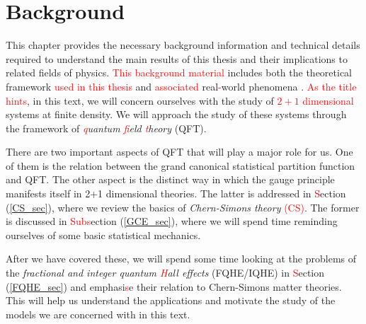 
    \graphicspath{{Background_Folder/figures/PNG/}{Background_Folder/figures/PDF/}{Background_Folder/figures/}}

\chapter{Background}
This chapter provides the necessary background information and technical details required to understand the main results of this thesis and their implications to related fields of physics. \textcolor{red}{This background material} includes both the theoretical framework \textcolor{red}{used in this thesis} and \textcolor{red}{associated} real\textcolor{red}{-}world phenomena  \colorbox{red}{ }. \textcolor{red}{As the title hints}, in this text, we will concern ourselves with the study of \textcolor{red}{$2+1$ dimensional} systems at finite density. We will approach the study of these \colorbox{red}{ }  systems through the framework of \textit{\textcolor{red}{q}uantum \textcolor{red}{f}ield \textcolor{red}{t}heory} (QFT). 

    There are two important aspects of QFT that will play a major role for us. One of them is the relation between the grand canonical statistical partition function and QFT. The other aspect is the distinct way in which the gauge principle manifests itself in 2+1 dimensional theories. The latter is addressed in \textcolor{red}{S}ection (\ref{CS_sec}), where we review the basics of \textit{Chern-Simons theory} \textcolor{red}{(CS)}. The former is discussed in \textcolor{red}{Subs}ection (\ref{GCE_sec}), where we will spend time reminding ourselves of some basic statistical mechanics. 


    After we have covered these, we will spend some time looking at the problems of the \textit{fractional and integer quantum \textcolor{red}{H}all effects} (FQHE/IQHE) in \textcolor{red}{S}ection (\ref{FQHE_sec}) and emphasi\textcolor{red}{s}e their relation to Chern-Simons matter theories. This will help us understand the applications and motivate the study of the models we are concerned with in this text.

